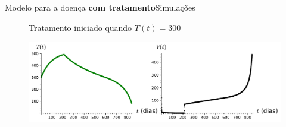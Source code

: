\documentclass[13pt]{beamer}
\begin{document}
\begin{frame}{Modelo para a doença \textbf{com tratamento}}{Simulações}
    \begin{figure}
        Tratamento iniciado quando \( T ( t ) = 300 \)
        \begin{center}
            \includegraphics[width=\textwidth]{../figuras/start_treatment_at_T_300.pdf}
        \end{center}
    \end{figure}
\end{frame}
\end{document}
